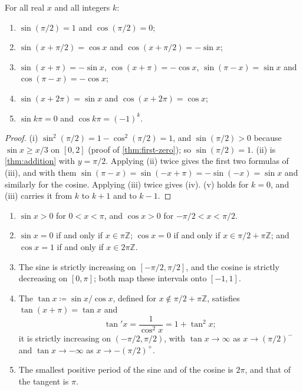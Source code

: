 \begin{theorem}
\label{thm:trig-periodic}
For all real $x$ and all integers $k$:
\begin{enumerate}
\item $\sin(\pi/2)=1$ and $\cos(\pi/2)=0$;
\item $\sin(x+\pi/2)=\cos x$ and $\cos(x+\pi/2)=-\sin x$;
\item $\sin(x+\pi)=-\sin x$, $\cos(x+\pi)=-\cos x$, $\sin(\pi-x)=\sin x$ and $\cos(\pi-x)=-\cos x$;
\item $\sin(x+2\pi)=\sin x$ and $\cos(x+2\pi)=\cos x$;
\item $\sin k\pi=0$ and $\cos k\pi=(-1)^k$.
\end{enumerate}
\end{theorem}

\begin{proof}
(i) $\sin^2(\pi/2)=1-\cos^2(\pi/2)=1$, and $\sin(\pi/2)>0$ because $\sin x\ge x/3$ on $[0,2]$ (proof of \cref{thm:first-zero}); so $\sin(\pi/2)=1$. (ii) is \cref{thm:addition} with $y=\pi/2$. Applying (ii) twice gives the first two formulas of (iii), and with them $\sin(\pi-x)=\sin(-x+\pi)=-\sin(-x)=\sin x$ and similarly for the cosine. Applying (iii) twice gives (iv). (v) holds for $k=0$, and (iii) carries it from $k$ to $k+1$ and to $k-1$.
\end{proof}

\begin{theorem}
\label{thm:trig-signs}
\leavevmode
\begin{enumerate}
\item $\sin x>0$ for $0<x<\pi$, and $\cos x>0$ for $-\pi/2<x<\pi/2$.
\item $\sin x=0$ if and only if $x\in\pi\mathbb Z$; $\cos x=0$ if and only if $x\in\pi/2+\pi\mathbb Z$; and $\cos x=1$ if and only if $x\in2\pi\mathbb Z$.
\item The sine is strictly increasing on $[-\pi/2,\pi/2]$, and the cosine is strictly decreasing on $[0,\pi]$; both map these intervals onto $[-1,1]$.
\item The  $\tan x\coloneqq\sin x/\cos x$, defined for $x\notin\pi/2+\pi\mathbb Z$, satisfies $\tan(x+\pi)=\tan x$ and
\[
\tan'x=\frac1{\cos^2x}=1+\tan^2x ;
\]
it is strictly increasing on $(-\pi/2,\pi/2)$, with $\tan x\to\infty$ as $x\to(\pi/2)^-$ and $\tan x\to-\infty$ as $x\to-(\pi/2)^+$.
\item The smallest positive period of the sine and of the cosine is $2\pi$, and that of the tangent is $\pi$.
\end{enumerate}
\end{theorem}

